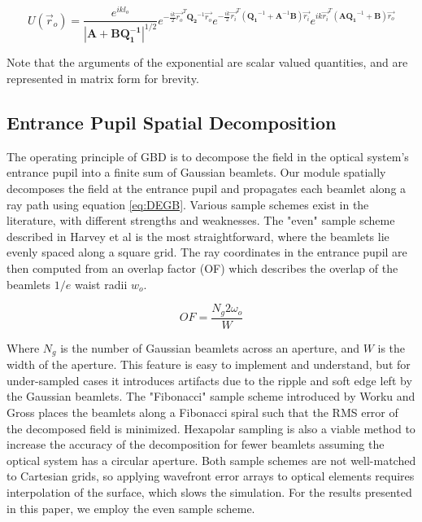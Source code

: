 \begin{equation}
    U(\vec{r}_{o}) = \frac{e^{ikl_{o}}}{|\mathbf{A} + \mathbf{BQ_{1}^{-1}}|^{1/2}} e^{-\frac{ik}{2}\vec{r_{o}}^{T}\mathbf{Q_{2}}^{-1}\vec{r_{o}}} e^{-\frac{ik}{2}\vec{r_{i}}^{T}(\mathbf{Q_{1}}^{-1} + \mathbf{A}^{-1}\mathbf{B})\vec{r_{i}}} e^{ik\vec{r_{i}}^{T}(\mathbf{A}\mathbf{Q_{1}}^{-1} + \mathbf{B})\vec{r_{o}}}
    \label{eq:DEGB}
\end{equation}

Note that the arguments of the exponential are scalar valued quantities, and are represented in matrix form for brevity.

\subsection{Entrance Pupil Spatial Decomposition}

The operating principle of GBD is to decompose the field in the optical system's entrance pupil into a finite sum of Gaussian beamlets. Our module spatially decomposes the field at the entrance pupil and propagates each beamlet along a ray path using equation \ref{eq:DEGB}. Various sample schemes exist in the literature, with different strengths and weaknesses. The "even" sample scheme described in Harvey et al\cite{Harvey15} is the most straightforward, where the beamlets lie evenly spaced along a square grid. The ray coordinates in the entrance pupil are then computed from an overlap factor (OF) which describes the overlap of the beamlets $1/e$ waist radii $w_o$\cite{Worku:18}.

\begin{equation}
    OF = \frac{N_{g} 2 \omega_{o}}{W}
\end{equation}

Where $N_{g}$ is the number of Gaussian beamlets across an aperture, and $W$ is the width of the aperture. This feature is easy to implement and understand, but for under-sampled cases it introduces artifacts due to the ripple and soft edge left by the Gaussian beamlets. The "Fibonacci" sample scheme introduced by Worku and Gross \cite{Worku:18} places the beamlets along a Fibonacci spiral such that the RMS error of the decomposed field is minimized. Hexapolar sampling is also a viable method to increase the accuracy of the decomposition for fewer beamlets assuming the optical system has a circular aperture\cite{Worku:18}. Both sample schemes are not well-matched to Cartesian grids, so applying wavefront error arrays to optical elements requires interpolation of the surface, which slows the simulation. For the results presented in this paper, we employ the even sample scheme.


